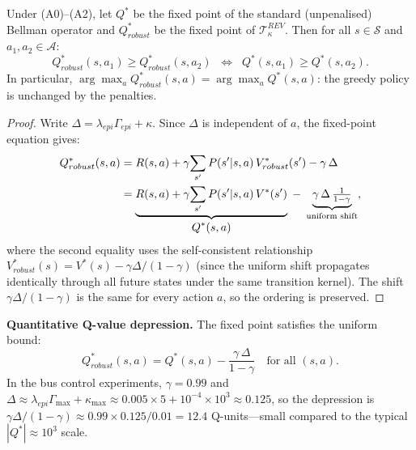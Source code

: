 \begin{proposition}
    \label{prop:nondegen}
    Under (A0)--(A2), let $Q^*$ be the fixed point of the standard (unpenalised)
    Bellman operator and $Q^*_{robust}$ be the fixed point of
    $\mathcal{T}^{REV}_\kappa$.  Then for all $s\in\mathcal{S}$ and
    $a_1,a_2\in\mathcal{A}$:
    \begin{equation}
        Q^*_{robust}(s,a_1) \ge Q^*_{robust}(s,a_2)
        \;\;\Longleftrightarrow\;\;
        Q^*(s,a_1) \ge Q^*(s,a_2).
        \label{eq:ranking}
    \end{equation}
    In particular, $\arg\max_a Q^*_{robust}(s,a) = \arg\max_a Q^*(s,a)$:
    the greedy policy is unchanged by the penalties.
\end{proposition}
\begin{proof}
    Write $\Delta = \lambda_{epi}\Gamma_{epi} + \kappa$.  Since $\Delta$ is
    independent of $a$, the fixed-point equation gives:
    \begin{align}
        Q^*_{robust}(s,a)
        &= R(s,a) + \gamma\!\sum_{s'}P(s'|s,a)\,V^*_{robust}(s')
          - \gamma\,\Delta \notag \\
        &= \underbrace{R(s,a) + \gamma\!\sum_{s'}P(s'|s,a)\,V^*(s')}_{\displaystyle Q^*(s,a)}
          \;-\; \underbrace{\gamma\,\Delta\,\tfrac{1}{1-\gamma}}_{\text{uniform shift}},
        \notag
    \end{align}
    where the second equality uses the self-consistent relationship
    $V^*_{robust}(s) = V^*(s) - \gamma\Delta/(1-\gamma)$ (since the uniform
    shift propagates identically through all future states under the same
    transition kernel).
    The shift $\gamma\Delta/(1-\gamma)$ is the same for every action $a$,
    so the ordering is preserved.
\end{proof}

\medskip
\noindent\textbf{Quantitative Q-value depression.}
The fixed point satisfies the uniform bound:
\begin{equation}
    Q^*_{robust}(s,a) = Q^*(s,a) - \frac{\gamma\,\Delta}{1-\gamma}
    \quad\text{for all }(s,a).
    \label{eq:depression}
\end{equation}
In the bus control experiments, $\gamma=0.99$ and
$\Delta \approx \lambda_{epi}\Gamma_{\max} + \kappa_{\max}
\approx 0.005\times 5 + 10^{-4}\times 10^3 \approx 0.125$, so the
depression is $\gamma\Delta/(1-\gamma) \approx 0.99 \times 0.125 / 0.01
= 12.4$ Q-units---small compared to the typical $|Q^*| \approx 10^3$ scale.


